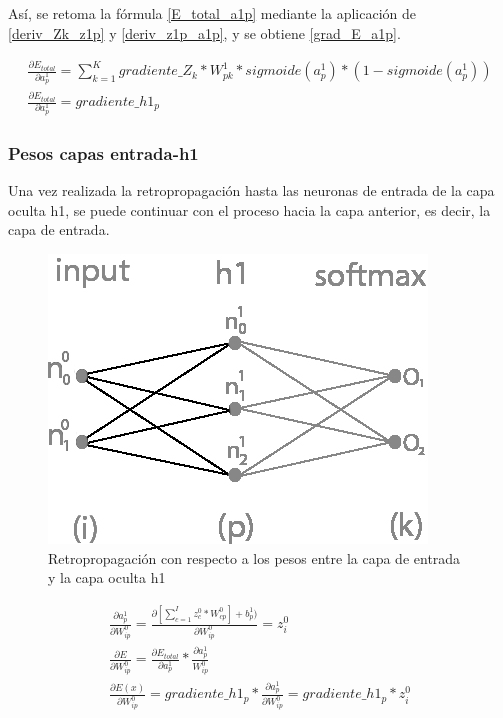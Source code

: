Así, se retoma la fórmula \ref{E_total_a1p} mediante la aplicación de \ref{deriv_Zk_z1p} y \ref{deriv_z1p_a1p}, y se obtiene \ref{grad_E_a1p}.

\begin{gather}
	\frac{\partial E_{total}}{\partial a^1_p} = \sum_{k=1}^K  gradiente\_Z_k * W^1_{pk} * sigmoide(a^1_p)*(1-sigmoide(a^1_p)) \label{grad_E_a1p} \\
	\frac{\partial E_{total}}{\partial a^1_p} = gradiente\_h1_p
\end{gather}

\subsubsection{Pesos capas entrada-h1}

Una vez realizada la retropropagación hasta las neuronas de entrada de la capa oculta h1, se puede continuar con el proceso hacia la capa anterior, es decir, la capa de entrada.

\begin{figure}[H]
	\centering
	\includegraphics[scale=0.35]{imagenes/nn_1_capa_pesos_input_h1.jpg}  
	\caption{Retropropagación con respecto a los pesos entre la capa de entrada y la capa oculta h1}
	\label{fig:nn_1_pesos_input_h1}
\end{figure}


\begin{gather}
	\frac{\partial a^1_p }{\partial W^0_{ip} } = \frac{\partial [\sum_{c=1}^{I} z^0_c * W^0_{cp}] + b^1_p)}{\partial W^0_{ip} } = z^0_i \label{grad_w0ip_1} \\
	\frac{\partial E}{\partial W^0_{ip}} = \frac{\partial E_{total} }{\partial a^1_p } * \frac{\partial a^1_p}{W^0_{ip}} \label{grad_w0ip_2} \\
	\frac{\partial E(x) }{\partial W^0_{ip} } = gradiente\_h1_p * \frac{\partial a^1_p }{\partial W^0_{ip} } = gradiente\_h1_p * z^0_i 
	\label{grad_w0ip_3}
\end{gather}

